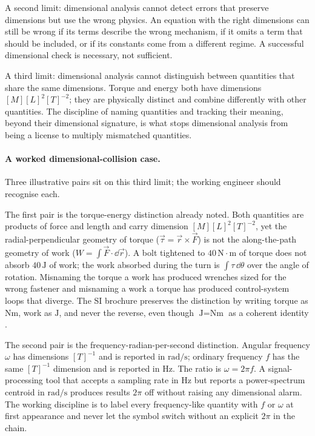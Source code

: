 A second limit: dimensional analysis cannot detect errors that
preserve dimensions but use the wrong physics. An equation with the
right dimensions can still be wrong if its terms describe the wrong
mechanism, if it omits a term that should be included, or if its
constants come from a different regime. A successful dimensional
check is necessary, not sufficient.

A third limit: dimensional analysis cannot distinguish between
quantities that share the same dimensions. Torque and energy both
have dimensions $[M][L]^{2}[T]^{-2}$; they are physically distinct
and combine differently with other quantities. The discipline of
naming quantities and tracking their meaning, beyond their dimensional
signature, is what stops dimensional analysis from being a
license to multiply mismatched quantities.

\paragraph{A worked dimensional-collision case.} Three illustrative
pairs sit on this third limit; the working engineer should recognise
each.

The first pair is the torque-energy distinction already noted.
Both quantities are products of force and length and carry
dimension $[M][L]^{2}[T]^{-2}$, yet the radial-perpendicular geometry
of torque ($\vec{\tau} = \vec{r} \times \vec{F}$) is not the
along-the-path geometry of work ($W = \int \vec{F} \cdot \dd
\vec{r}$). A bolt tightened to $40 \,\text{N} \cdot \text{m}$ of
torque does not absorb $40 \,\si{\joule}$ of work; the work absorbed
during the turn is $\int \tau \,\dd\theta$ over the angle of
rotation. Misnaming the torque a work has produced wrenches sized
for the wrong fastener and misnaming a work a torque has produced
control-system loops that diverge. The SI brochure preserves the
distinction by writing torque as $\si{\newton\meter}$, work as
$\si{\joule}$, and never the reverse, even though
$\si{\joule} = \si{\newton\meter}$ as a coherent identity
\cite[ch.~3]{std:bipm-si2019}.

The second pair is the frequency-radian-per-second distinction.
Angular frequency $\omega$ has dimensions $[T]^{-1}$ and is reported
in $\si{\radian\per\second}$; ordinary frequency $f$ has the same
$[T]^{-1}$ dimension and is reported in $\si{\hertz}$. The ratio is
$\omega = 2\pi f$. A signal-processing tool that accepts a sampling
rate in $\si{\hertz}$ but reports a power-spectrum centroid in
$\si{\radian\per\second}$ produces results $2\pi$ off without
raising any dimensional alarm. The working discipline is to label
every frequency-like quantity with $f$ or $\omega$ at first
appearance and never let the symbol switch without an explicit
$2\pi$ in the chain.

